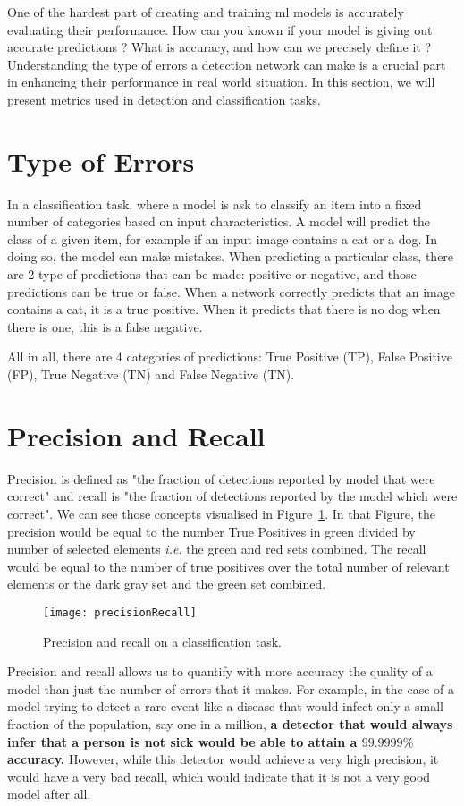 One of the hardest part of creating and training \gls{ml} models is accurately evaluating their performance. How can you known if your model is giving out accurate predictions ? What is accuracy, and how can we precisely define it ? Understanding the type of errors a detection network can make is a crucial part in enhancing their performance in real world situation. In this section, we will present metrics used in detection and classification tasks.


\section{Type of Errors}
In a classification task, where a model is ask to classify an item into a fixed number of categories based on input characteristics. A model will predict the class of a given item, for example if an input image contains a cat or a dog. In doing so, the model can make mistakes. When predicting a particular class, there are 2 type of predictions that can be made: positive or negative, and those predictions can be true or false. When a network correctly predicts that an image contains a cat, it is a true positive. When it predicts that there is no dog when there is one, this is a false negative.

All in all, there are 4 categories of predictions: True Positive (TP), False Positive (FP), True Negative (TN) and False Negative (TN). 
\section{Precision and Recall}
Precision is defined as "the fraction of detections reported by model that were correct" and recall is "the fraction of detections reported by the model which were correct"\cite[p.411]{Goodfellow2016}. We can see those concepts visualised in Figure~\ref{fig:precRecall}. In that Figure, the precision would be equal to the number True Positives in green divided by number of selected elements \textit{i.e.} the green and red sets combined. The recall would be equal to the number of true positives over the total number of relevant elements or the dark gray set and the green set combined. 

\begin{figure}[h]
  \centering
  \texttt{[image: precisionRecall]}
	\caption[]{Precision and recall on a classification task.}
  \label{fig:precRecall}
\end{figure}

Precision and recall allows us to quantify with more accuracy the quality of a model than just the number of errors that it makes. For example, in the case of a model trying to detect a rare event like a disease that would infect only a small fraction of the population, say one in a million, \textbf{a detector that would always infer that a person is not sick would be able to attain a $99.9999\%$ accuracy.} However, while this detector would achieve a very high precision, it would have a very bad recall, which would indicate that it is not a very good model after all.

